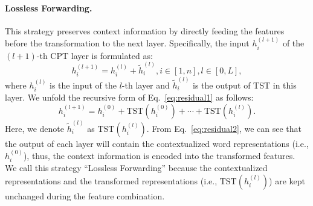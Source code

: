\documentclass[11pt,a4paper]{article}
\begin{document}
\paragraph{Lossless Forwarding.}
This strategy preserves context information by directly feeding the features before the transformation to the next layer. Specifically, the input $h^{(l+1)}_i$ of the $(l+1)$-th CPT layer is formulated as:
\begin{equation}
\label{eq:residual1}
    h^{(l+1)}_i = h^{(l)}_i + \tilde{h}^{(l)}_i, i \in [1, n], l \in [0, L],
\end{equation}
where $h^{(l)}_i$ is the input of the $l$-th layer and $\tilde{h}^{(l)}_i$ is the output of TST in this layer. We unfold the recursive form of Eq.~\ref{eq:residual1} as follows:
\begin{equation}
\label{eq:residual2}
h^{(l+1)}_i = h^{(0)}_i + \text{TST}(h^{(0)}_i) + \cdots + \text{TST}(h^{(l)}_i).
\end{equation}
Here, we denote $\tilde{h}^{(l)}_i$ as $\mathrm{TST}(h^{(l)}_i)$. From Eq.~\ref{eq:residual2}, we can see that the output of each layer will contain the contextualized word representations (i.e., $h^{(0)}_i$), thus, the context information is encoded into the transformed features. We call this strategy ``Lossless Forwarding'' because the contextualized representations and the transformed representations (i.e., $\text{TST}(h^{(l)}_i)$) are kept unchanged during the feature combination.
\end{document}
